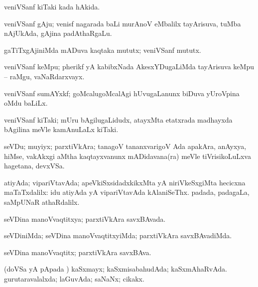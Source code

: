 \bentry
{} 
\gl{\gu}
\expl{}
\bmng
 veniVSanf kiTaki kada hAkida. 
\emng
\eentry

\bentry
{}
\gl{\nA}
\expl{}
\bmng
 veniVSanf gAju; venisf nagarada baLi murAnoV eMbalilx tayArisuva, tuMba nAjUkAda, gAjina padAthaRgaLu. 
\emng
\eentry

\bentry
{}
\gl{\nA}
\expl{}
\bmng
 gaTiTxgAjiniMda mADuva kaqtaka mututx; veniVSanf mututx. 
\emng
\eentry

\bentry
{}
\gl{\nA}
\expl{}
\bmng
 veniVSanf keMpu; pherikf yA kabibxNada AkesxYDugaLiMda tayArisuva keMpu -- raMgu, vaNaRdarxvayx. 
\emng
\eentry

\bentry
{}
\gl{\nA}
\expl{}
\bmng
 veniVSanf sumAYxkf; goMcalugoMcalAgi hUvugaLanunx biDuva yUroVpina oMdu baLiLx. 
\emng
\eentry

\bentry
{}
\gl{\nA}
\expl{}
\bmng
 veniVSanf kiTaki; mUru bAgilugaLidudx, atayxMta etatxrada madhayxda bAgilina meVle kamAnuLaLx kiTaki. 
\emng
\eentry

\bentry
{} 
\gl{\nA}
\expl{}
\bmng
 seVDu; muyiyx; parxtiVkAra; tanagoV tananxvarigoV Ada apakAra, anAyxya, hiMse, \mo vakAkxgi aMtha kaqtayxvanunx mADidavana(ra) meVle tiVrisikoLuLxva hagetana, devxVSa. 
\emng

\noindent 
\gl{\pagu}
\expl{}
\bmng
  atiyAda; vipariVtavAda; apeVkiSxsidadxkikxMta yA niriVkeSxgiMta hecicxna maTaTxdalilx: 
\banum
{}  idu atiyAda yA vipariVtavAda kAlaniSeThx. 
 padada, padagaLa, saMpUNaR athaRdalilx. 
\eanum
\emng
\eentry

\bentry 
{} 
\gl{\gu}
\expl{}
\bmng
 seVDina manoVvaqtitxya; parxtiVkAra savxBAvada. 
\emng
\eentry

\bentry
{} 
\gl{\kirxvi}
\expl{}
\bmng
 seVDiniMda; seVDina manoVvaqtitxyiMda; parxtiVkAra savxBAvadiMda. 
\emng
\eentry

\bentry
{} 
\gl{\nA}
\expl{}
\bmng
 seVDina manoVvaqtitx; parxtiVkAra savxBAva. 
\emng
\eentry

\bentry
{} 
\gl{\gu}
\expl{}
\bmng
 (doVSa yA pApada \vi) 
\banum
{} kaSxmayx; kaSxmisabahudAda; kaSxmAhaRvAda. 
 gurutaravalalxda; laGuvAda; saNaNx; cikakx. 
\eanum
\emng
\eentry

